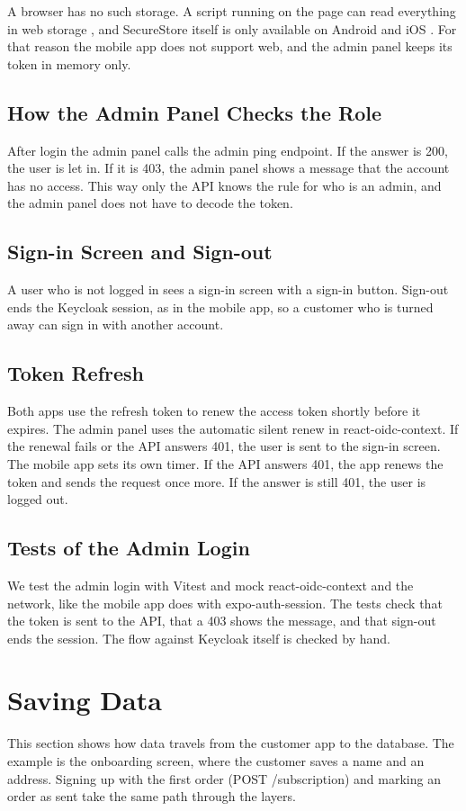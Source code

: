 \documentclass[a4paper,11pt]{article}
\begin{document}
A browser has no such storage. A script running on the page can read everything in web storage \cite{owasp-html5-security}, and SecureStore itself is only available on Android and iOS \cite{expo-securestore}. For that reason the mobile app does not support web, and the admin panel keeps its token in memory only.

\subsection{How the Admin Panel Checks the Role}
After login the admin panel calls the admin ping endpoint. If the answer is 200, the user is let in. If it is 403, the admin panel shows a message that the account has no access. This way only the API knows the rule for who is an admin, and the admin panel does not have to decode the token.

\subsection{Sign-in Screen and Sign-out}
A user who is not logged in sees a sign-in screen with a sign-in button. Sign-out ends the Keycloak session, as in the mobile app, so a customer who is turned away can sign in with another account.

\subsection{Token Refresh}
Both apps use the refresh token to renew the access token shortly before it expires. The admin panel uses the automatic silent renew in react-oidc-context. If the renewal fails or the API answers 401, the user is sent to the sign-in screen. The mobile app sets its own timer. If the API answers 401, the app renews the token and sends the request once more. If the answer is still 401, the user is logged out.

\subsection{Tests of the Admin Login}
We test the admin login with Vitest and mock react-oidc-context and the network, like the mobile app does with expo-auth-session. The tests check that the token is sent to the API, that a 403 shows the message, and that sign-out ends the session. The flow against Keycloak itself is checked by hand.

\section{Saving Data}
This section shows how data travels from the customer app to the database. The example is the onboarding screen, where the customer saves a name and an address. Signing up with the first order (POST /subscription) and marking an order as sent take the same path through the layers.
\end{document}
